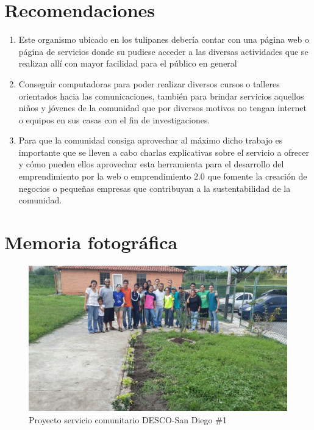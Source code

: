 \documentclass[11pt, a4paper, twosides]{report}
\begin{document}
\chapter{Recomendaciones} 
\begin{enumerate}
\item Este organismo ubicado en los tulipanes debería contar con una página web o página de servicios donde su pudiese acceder a las diversas actividades que se realizan allí con mayor facilidad para el público en general
\item Conseguir computadoras para poder realizar diversos cursos o talleres orientados hacia las comunicaciones, también para brindar servicios aquellos niños y jóvenes de la comunidad que por diversos motivos no tengan internet o equipos en sus casas con el fin de investigaciones.
\item Para que la comunidad consiga aprovechar al máximo dicho trabajo es importante que se lleven a cabo charlas explicativas sobre el servicio a ofrecer y cómo pueden ellos aprovechar esta herramienta para el desarrollo del emprendimiento por la web o emprendimiento 2.0 que fomente la creación de negocios o pequeñas empresas que contribuyan a la sustentabilidad de la comunidad.
\end{enumerate}



\chapter{Memoria fotográfica}

\begin{figure}[ht]
    \centering
    \includegraphics[width=0.76\linewidth]{1.jpg}
    \caption{Proyecto servicio comunitario DESCO-San Diego \#1}
    \label{fig:1}
\end{figure}
\end{document}
